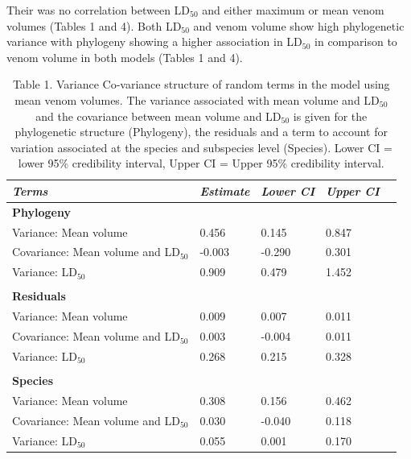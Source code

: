 Their was no correlation between LD$_{50}$ and either maximum or mean venom volumes (Tables 1 and 4). Both LD$_{50}$  and venom volume show high phylogenetic variance with phylogeny showing a higher association in LD$_{50}$ in comparison to venom volume in both models (Tables 1 and 4). 

\clearpage

\begin{table}[H]
  \centering
    \caption*{Table 1. Variance Co-variance structure of random terms in the model using mean venom volumes. The variance associated with mean volume and LD$_{50}$ and the covariance between mean volume and LD$_{50}$ is given for the phylogenetic structure (Phylogeny), the residuals and a term to account for variation associated at the species and subspecies level (Species). Lower CI = lower 95\% credibility interval, Upper CI = Upper 95\% credibility interval.}
\begin{tabular}{*5l}    \toprule
\emph{Terms} & \emph{Estimate} & \emph{Lower CI} & \emph{Upper CI}\\\midrule
\textbf{Phylogeny} &   &   &  \\ 
Variance: Mean volume & 0.456 & 0.145 & 0.847 \\
Covariance: Mean volume and LD$_{50}$ &-0.003  &-0.290  & 0.301 \\
Variance: LD$_{50}$ & 0.909 & 0.479 & 1.452 \\

 &   &   &  \\

\textbf{Residuals} &   &   &  \\ 
Variance: Mean volume & 0.009 & 0.007 & 0.011 \\
Covariance: Mean volume and LD$_{50}$ & 0.003  &  -0.004  & 0.011 \\
Variance: LD$_{50}$ & 0.268 & 0.215 & 0.328 \\

 &   &   &  \\ 

\textbf{Species} &   &   &  \\ 
Variance: Mean volume & 0.308 & 0.156 & 0.462 \\
Covariance: Mean volume and LD$_{50}$ & 0.030  &  -0.040  & 0.118 \\
Variance: LD$_{50}$ & 0.055 & 0.001 & 0.170 \\\bottomrule
 \hline
\end{tabular}
  \label{tbl:Table 1.}
\end{table}




